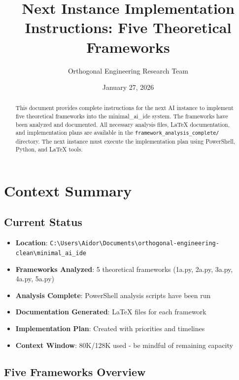 \documentclass[12pt]{article}
\title{Next Instance Implementation Instructions: Five Theoretical Frameworks}
\author{Orthogonal Engineering Research Team}
\date{January 27, 2026}
\begin{document}
\maketitle

\begin{abstract}
This document provides complete instructions for the next AI instance to implement five theoretical frameworks into the minimal\_ai\_ide system. The frameworks have been analyzed and documented. All necessary analysis files, LaTeX documentation, and implementation plans are available in the \texttt{framework\_analysis\_complete/} directory. The next instance must execute the implementation plan using PowerShell, Python, and LaTeX tools.
\end{abstract}

\tableofcontents

\section{Context Summary}

\subsection{Current Status}
\begin{itemize}
    \item \textbf{Location}: \texttt{C:\textbackslash Users\textbackslash Aidor\textbackslash Documents\textbackslash orthogonal-engineering-clean\textbackslash minimal\_ai\_ide}
    \item \textbf{Frameworks Analyzed}: 5 theoretical frameworks (1a.py, 2a.py, 3a.py, 4a.py, 5a.py)
    \item \textbf{Analysis Complete}: PowerShell analysis scripts have been run
    \item \textbf{Documentation Generated}: LaTeX files for each framework
    \item \textbf{Implementation Plan}: Created with priorities and timelines
    \item \textbf{Context Window}: 80K/128K used - be mindful of remaining capacity
\end{itemize}

\subsection{Five Frameworks Overview}
\end{document}
